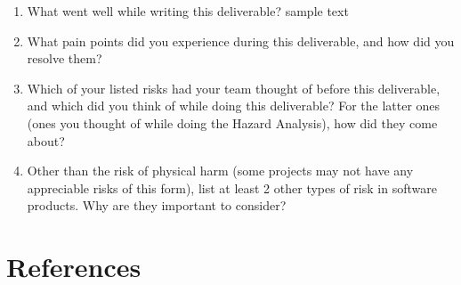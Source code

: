 \documentclass{article}
\begin{document}



\begin{enumerate}
    \item What went well while writing this deliverable? sample text
    \item What pain points did you experience during this deliverable, and how
    did you resolve them?
    \item Which of your listed risks had your team thought of before this
    deliverable, and which did you think of while doing this deliverable? For
    the latter ones (ones you thought of while doing the Hazard Analysis), how
    did they come about?
    \item Other than the risk of physical harm (some projects may not have any
    appreciable risks of this form), list at least 2 other types of risk in
    software products. Why are they important to consider?
\end{enumerate}

\section{References}
\sloppy
\end{document}
